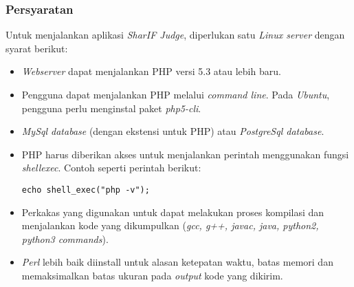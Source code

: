 \subsubsection{Persyaratan}
\label{subsubsec:persyaratan}
Untuk menjalankan aplikasi \textit{SharIF Judge}, diperlukan satu \textit{Linux server} dengan syarat berikut:
\begin{itemize}
	\item \textit{Webserver} dapat menjalankan PHP versi 5.3 atau lebih baru.
	\item Pengguna dapat menjalankan PHP melalui \textit{command line}. Pada \textit{Ubuntu}, pengguna perlu menginstal paket \textit{php5-cli}.
	\item \textit{MySql database} (dengan ekstensi untuk PHP) atau \textit{PostgreSql database}.
	\item PHP harus diberikan akses untuk menjalankan perintah menggunakan fungsi \textit{shell\textunderscore exec}. Contoh seperti perintah berikut:
	\begin{lstlisting}[basicstyle=\ttfamily, frame=single,
	columns=fullflexible, keepspaces=true, breaklines=true, label=ls:1]
	echo shell_exec("php -v");
	\end{lstlisting}
	\item Perkakas yang digunakan untuk dapat melakukan proses kompilasi dan menjalankan kode yang dikumpulkan (\textit{gcc, g++, javac, java, python2, python3 commands}).
	\item \textit{Perl} lebih baik diinstall untuk alasan ketepatan waktu, batas memori dan memaksimalkan batas ukuran pada \textit{output} kode yang dikirim.
\end{itemize}

